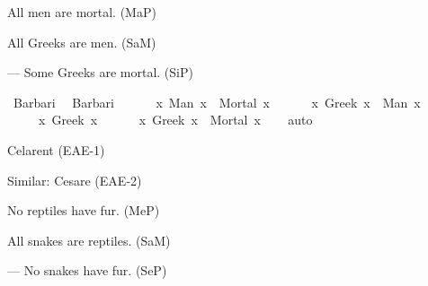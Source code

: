 \begin{isabellebody}
\begin{exercise}[subtitle=Silogizmi]
\begin{isamarkuptext}
\end{isamarkuptext}\isamarkuptrue%
%
\begin{isamarkuptext}%
All men are mortal. (MaP)%
\end{isamarkuptext}\isamarkuptrue%
%
\begin{isamarkuptext}%
All Greeks are men. (SaM)%
\end{isamarkuptext}\isamarkuptrue%
%
\begin{isamarkuptext}%
— Some Greeks are mortal. (SiP)%
\end{isamarkuptext}\isamarkuptrue%
\isamarkupfalse%
\ Barbari{\isacharcolon}{\kern0pt}\ %
\isadelimproof
%
\endisadelimproof
%
\isatagproof
%
\endisatagproof
{\isafoldproof}%
%
\isadelimproof
\isanewline
%
\endisadelimproof
{}\isamarkupfalse%
\ Barbari{\isacharcolon}{\kern0pt}\ {\isachardoublequoteopen}\isanewline
\ \ \ \ {\isacharparenleft}{\kern0pt}{\isasymforall}\ x{\isachardot}{\kern0pt}\ Man\ x\ {\isasymlongrightarrow}\ Mortal\ x{\isacharparenright}{\kern0pt}\ {\isasymand}\isanewline
\ \ \ \ {\isacharparenleft}{\kern0pt}{\isasymforall}\ x{\isachardot}{\kern0pt}\ Greek\ x\ {\isasymlongrightarrow}\ Man\ x{\isacharparenright}{\kern0pt}\ {\isasymand}\isanewline
\ \ \ \ {\isacharparenleft}{\kern0pt}{\isasymexists}\ x{\isachardot}{\kern0pt}\ Greek\ x{\isacharparenright}{\kern0pt}\ {\isasymlongrightarrow}\isanewline
\ \ \ \ {\isacharparenleft}{\kern0pt}{\isasymexists}\ x{\isachardot}{\kern0pt}\ Greek\ x\ {\isasymand}\ Mortal\ x{\isacharparenright}{\kern0pt}{\isachardoublequoteclose}\isanewline
%
\isadelimproof
\ \ %
\endisadelimproof
%
\isatagproof
{}\isamarkupfalse%
\ auto%
\endisatagproof
{\isafoldproof}%
%
\isadelimproof
%
\endisadelimproof
%
\begin{isamarkuptext}%
Celarent (EAE-1)%
\end{isamarkuptext}\isamarkuptrue%
%
\begin{isamarkuptext}%
Similar: Cesare (EAE-2)%
\end{isamarkuptext}\isamarkuptrue%
%
\begin{isamarkuptext}%
No reptiles have fur. (MeP)%
\end{isamarkuptext}\isamarkuptrue%
%
\begin{isamarkuptext}%
All snakes are reptiles. (SaM)%
\end{isamarkuptext}\isamarkuptrue%
%
\begin{isamarkuptext}%
— No snakes have fur. (SeP)%
\end{isamarkuptext}\isamarkuptrue%
\isamarkupfalse%

\end{exercise}
\end{isabellebody}
